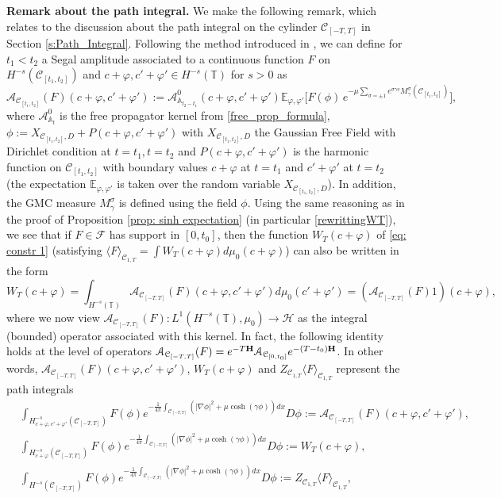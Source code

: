 \documentclass[11pt]{amsart}
\numberwithin{equation}{section}
\theoremstyle{definition}
\newcommand{\A}{\mathbb{A}}
\newcommand{\cjd}{\rangle}
\newcommand{\cjg}{\langle}
\def\E{\mathbb{E}}
\newcommand{\mc}{\mathcal}
\def\T{\mathbb{T}}
\begin{document}
\textbf{Remark about the path integral.} We make the following remark, which relates to the discussion about the path integral on the cylinder $\mc{C}_{[-T,T]}$ in Section \ref{s:Path_Integral}. Following the method introduced in \cite[Definition 4.2]{GKRV21_Segal}, we can define for $t_1<t_2$ a Segal amplitude associated to a continuous function $F$  on $H^{-s}(\mc{C}_{[t_1,t_2]})$ and $c+\varphi,c'+\varphi'\in H^{-s}(\T)$ for $s>0$ as 
\[\mc{A}_{\mc{C}_{[t_1,t_2]}}(F)(c+\varphi,c'+\varphi'):= \mc{A}^0_{\A_{t_2-t_1}}(c+\varphi,c'+\varphi')\E_{\varphi,\varphi'}\Big[F(\phi) \,  e^{-\mu \sum_{\sigma = \pm 1}e^{\sigma\gamma c} M_\gamma^\sigma(\mc{C}_{[t_1,t_2]})} \Big],\]
where $\mc{A}^0_{\A_{t}}$ is the free propagator kernel from \eqref{free_prop_formula}, 
$\phi:=X_{\mc{C}_{[t_1,t_2]},D}+P(c+\varphi,c'+\varphi')$  with $X_{\mc{C}_{[t_1,t_2]},D}$ the Gaussian Free Field with Dirichlet condition at $t=t_1,t=t_2$ and $P(c+\varphi,c'+\varphi')$ is the harmonic function on $\mc{C}_{[t_1,t_2]}$ with boundary values $c+\varphi$ at $t=t_1$ and $c'+\varphi'$ at $t=t_2$ (the expectation $\E_{\varphi,\varphi'}$ is taken over the random variable $X_{\mc{C}_{[t_1,t_2]},D}$). In addition, the GMC measure $M^\sigma_\gamma$ is defined using the field $\phi$. Using the same reasoning as in the proof of Proposition \ref{prop: sinh expectation} (in particular \eqref{rewrittingWT}), we see that if $F \in \mathcal{F}$ has support in $[0,t_0]$, then the function $W_T(c+\varphi)$ of \eqref{eq: constr 1} (satisfying 
$\cjg F\cjd_{\mc{C}_{1,T}}=\int W_T(c+\varphi)d\mu_0(c+\varphi)$) can also be written in the form
\[ W_T(c+\varphi)= \int_{H^{-s}(\T)} \mc{A}_{\mc{C}_{[-T,T]}}(F)(c+\varphi,c'+\varphi')d\mu_0(c'+\varphi')=(\mc{A}_{\mc{C}_{[-T,T]}}(F)1)(c+\varphi),\]
where we now view $\mc{A}_{\mc{C}_{[-T,T]}}(F):L^1(H^{-s}(\T),\mu_0)\to \mc{H}$ as the integral (bounded) operator associated with this kernel. In fact, the following identity holds at the level of operators 
$\mc{A}_{\mc{C}_{[-T,T]}}(F)=e^{-T{\bf H}}\mc{A}_{\mc{C}_{[0,t_0]}}e^{-(T-t_0){\bf H}}$.
In other words, $\mc{A}_{\mc{C}_{[-T,T]}}(F)(c+\varphi,c'+\varphi')$, $W_T(c+\varphi)$ and $Z_{\mc{C}_{1,T}}\langle F \rangle_{\mc{C}_{1,T}}$ represent the path integrals 
\begin{align}
& \int_{H^{-s}_{c+\varphi,c'+\varphi'}(\mc{C}_{[-T,T]})} F(\phi) e^{-\frac{1}{4\pi} \int_{\mathcal{C}_{[-T,T]}}(|\nabla \phi|^2+\mu\cosh(\gamma \phi))dx} D\phi:=\mc{A}_{\mc{C}_{[-T,T]}}(F)(c+\varphi,c'+\varphi'),\label{double_partialPI}\\
& \int_{H^{-s}_{c+\varphi}(\mc{C}_{[-T,T]})} F(\phi) e^{-\frac{1}{4\pi} \int_{\mathcal{C}_{[-T,T]}}(|\nabla \phi|^2+\mu\cosh(\gamma \phi))dx} D\phi:=W_T(c+\varphi),\label{partialPI}\\
& \int_{H^{-s}(\mc{C}_{[-T,T]})} F(\phi) e^{-\frac{1}{4\pi} \int_{\mathcal{C}_{[-T,T]}}(|\nabla \phi|^2+\mu\cosh(\gamma \phi))dx} D\phi:= Z_{\mc{C}_{1,T}}\langle F \rangle_{\mc{C}_{1,T}}, \label{fullPI}
\end{align}
\end{document}
